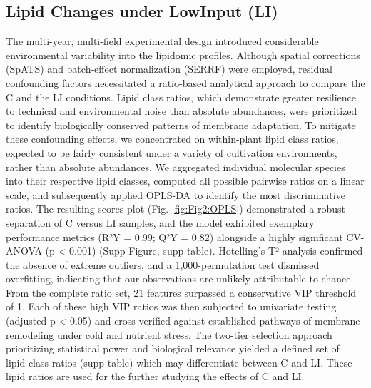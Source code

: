 \documentclass[10pt,letterpaper]{article}
\begin{document}
\subsection*{Lipid Changes under LowInput (LI)}
The multi-year, multi-field experimental design introduced considerable environmental variability into the lipidomic profiles. Although spatial corrections (SpATS) and batch-effect normalization (SERRF) were employed, residual confounding factors necessitated a ratio-based analytical approach to compare the C and the LI conditions. Lipid class ratios, which demonstrate greater resilience to technical and environmental noise than absolute abundances, were prioritized to identify biologically conserved patterns of membrane adaptation. To mitigate these confounding effects, we concentrated on within-plant lipid class ratios, expected to be fairly consistent under a variety of cultivation environments, rather than absolute abundances. We aggregated individual molecular species into their respective lipid classes, computed all possible pairwise ratios on a linear scale, and subsequently applied OPLS-DA to identify the most discriminative ratios. The resulting scores plot (Fig. \ref{fig:Fig2:OPLS}) demonstrated a robust separation of C versus LI samples, and the model exhibited exemplary performance metrics (R²Y = 0.99; Q²Y = 0.82) alongside a highly significant CV-ANOVA (p < 0.001) (Supp Figure, supp table). Hotelling’s T² analysis confirmed the absence of extreme outliers, and a 1,000-permutation test dismissed overfitting, indicating that our observations are unlikely attributable to chance. From the complete ratio set, 21 features surpassed a conservative VIP threshold of 1. Each of these high VIP ratios was then subjected to univariate testing (adjusted p < 0.05) and cross-verified against established pathways of membrane remodeling under cold and nutrient stress. The two-tier selection approach prioritizing statistical power and biological relevance yielded a defined set of lipid-class ratios (supp table) which may differentiate between C and LI. These lipid ratios are used for the further studying the effects of C and LI. 
\end{document}
